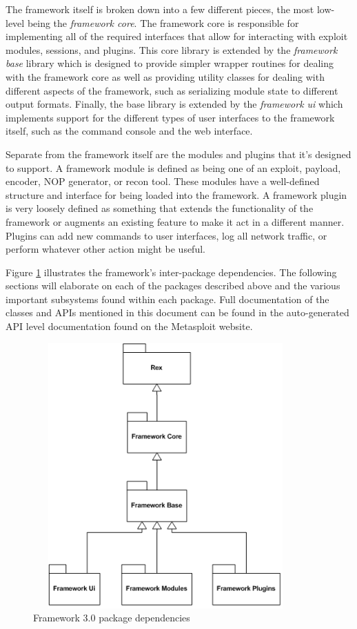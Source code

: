 \documentclass{report}
\begin{document}
\par
The framework itself is broken down into a few different pieces, the
most low-level being the \textit{framework core}.  The framework
core is responsible for implementing all of the required interfaces
that allow for interacting with exploit modules, sessions, and
plugins. This core library is extended by the \textit{framework
base} library which is designed to provide simpler wrapper routines
for dealing with the framework core as well as providing utility
classes for dealing with different aspects of the framework, such as
serializing module state to different output formats.  Finally, the
base library is extended by the \textit{framework ui} which
implements support for the different types of user interfaces to the
framework itself, such as the command console and the web interface.

\par
Separate from the framework itself are the modules and plugins that
it's designed to support.  A framework module is defined as being
one of an exploit, payload, encoder, NOP generator, or recon tool.
These modules have a well-defined structure and interface for being
loaded into the framework.  A framework plugin is very loosely
defined as something that extends the functionality of the framework
or augments an existing feature to make it act in a different
manner. Plugins can add new commands to user interfaces, log all
network traffic, or perform whatever other action might be useful.

\par
Figure \ref{fig-arch-pkg} illustrates the framework's inter-package
dependencies.  The following sections will elaborate on each of the
packages described above and the various important subsystems found
within each package.  Full documentation of the classes and APIs
mentioned in this document can be found in the auto-generated API
level documentation found on the Metasploit website.

\begin{figure}[h]
\begin{center}
\includegraphics[height=4in,width=4in]{dev_guide_arch_packages}
\caption{Framework 3.0 package dependencies} \label{fig-arch-pkg}
\end{center}
\end{figure}
\end{document}
